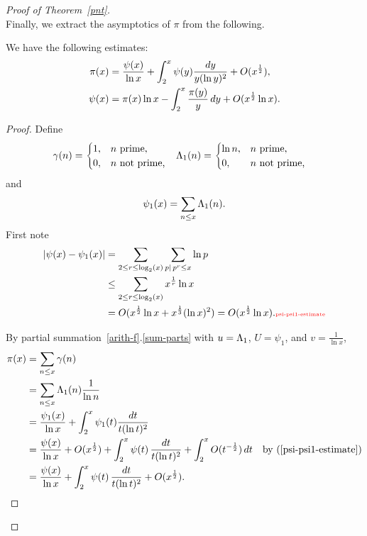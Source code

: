 \begin{proof}[Proof of Theorem~\ref{pnt}]
\begin{equation}
\end{equation}
Finally, we extract the asymptotics of $\pi$ from the following.
\begin{lem}
We have the following estimates:
\begin{align*}
\pi(x)&=\frac{\psi(x)}{\ln x}+\int_2^x \psi(y)\frac{dy}{y(\ln y)^2}+O(x^{\frac{1}{2}}),\\
\psi(x)&=\pi(x)\ln x-\int_2^x \frac{\pi(y)}{y}\,dy +O(x^{\frac{1}{2}}\ln x).
\end{align*}
\end{lem}
\begin{proof}
Define
\begin{align*}
\gamma(n)&=\begin{cases}
1,&n\text{ prime,}\\
0,&n\text{ not prime,}
\end{cases}&
\Lambda_1(n)&=\begin{cases}
\ln n,&n\text{ prime,}\\
0,&n\text{ not prime,}
\end{cases}
\end{align*}
and
\[
\psi_1(x)=\sum_{n\le x}\Lambda_1(n).
\]
First note
\begin{align}
\nonumber
|\psi(x)-\psi_1(x)|&=\sum_{2\le r\le \log_2(x)}\sum_{p\mid\,p^r\le x} \ln p\\
\nonumber
&\le \sum_{2\le r\le \log_2(x)} x^{\rc r}\ln x\\
&=O(x^{\rc 2}\ln x+x^{\rc 3}(\ln x)^2)=O(x^{\rc 2}\ln x).
\llabel{psi-psi1-estimate}
\end{align}

 By partial summation~\ref{arith-f}.\ref{sum-parts} with $u=\Lambda_1$, $U=\psi_1$, and $v=\frac{1}{\ln x}$,
\begin{align*}
\pi(x)&=\sum_{n\le x} \ga(n)\\
&=\sum_{n\le x}\La_1(n) \rc{\ln n}\\
&=\fc{\psi_1(x)}{\ln x} + \int_2^x\psi_1(t)\frac{dt}{t(\ln t)^2}\\
&=\fc{\psi(x)}{\ln x} +O(x^{\rc2}) +\int_2^x\psi(t)\,\fc{dt}{t(\ln t)^2}
+\int_2^x O(t^{-\rc2})\,dt&\by{psi-psi1-estimate}\\
&=\fc{\psi(x)}{\ln x}+\int_2^x\psi(t)\,\fc{dt}{t(\ln t)^2}+O(x^{\rc2}).
\end{align*}


\end{proof}
\end{proof}
